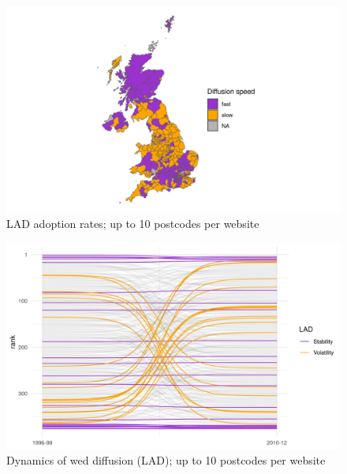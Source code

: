 \documentclass[
  authoryear,
  preprint,
  3p]{elsarticle}
\begin{document}
\begin{figure}[H]

{\centering \includegraphics[width=1\textwidth,height=\textheight]{../../outputs/s/speed_map_10.png}

}

\caption{\label{s_map10}LAD adoption rates; up to 10 postcodes per
website}

\end{figure}%

\begin{figure}[H]

{\centering \includegraphics[width=1\textwidth,height=\textheight]{../../outputs/ranks/web_per_firm2000_2012_only0595_av_10.png}

}

\caption{\label{rank10}Dynamics of wed diffusion (LAD); up to 10
postcodes per website}

\end{figure}%
\end{document}
